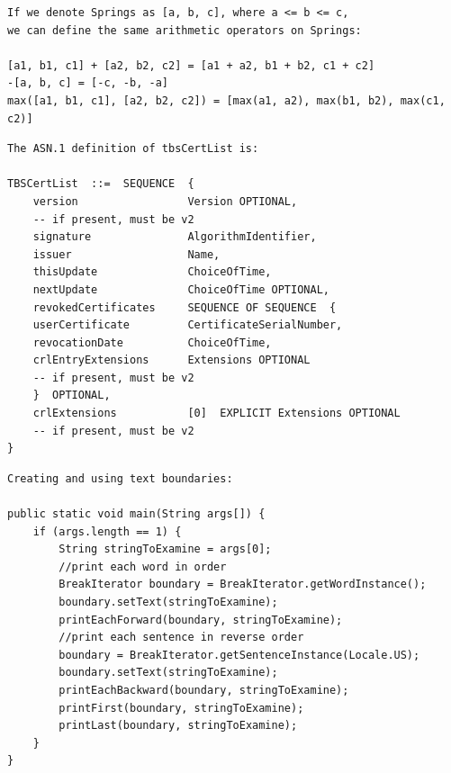 \begin{lstlisting}[label=invalid-caveat-1,caption={An example of a caveat sentence extracted from the \lstinline{javax.swing.Spring} documentation containing some snippets of code or mathematical expressions. Code sections are highlighted pink.},float,frame=tb,numbers=none,language=None,linebackgroundcolor={\lstcolorlines{4,5,6}}]
If we denote Springs as [a, b, c], where a <= b <= c, 
we can define the same arithmetic operators on Springs:

[a1, b1, c1] + [a2, b2, c2] = [a1 + a2, b1 + b2, c1 + c2]
-[a, b, c] = [-c, -b, -a]
max([a1, b1, c1], [a2, b2, c2]) = [max(a1, a2), max(b1, b2), max(c1, c2)]
\end{lstlisting}

\begin{lstlisting}[label=invalid-caveat-2,caption={An example of a caveat sentence extracted from the \lstinline{java.security.cert.X509CRL} documentation explaining the structure of a \lstinline{TBSCertList} object. Code sections are highlighted pink.},float,frame=tb,numbers=none,language=None,linebackgroundcolor={\lstcolorlines{3,4,5,6,7,8,9,10,11,12,13,14,15,16,17}}]
The ASN.1 definition of tbsCertList is:

TBSCertList  ::=  SEQUENCE  {
	version                 Version OPTIONAL,
	-- if present, must be v2
	signature               AlgorithmIdentifier,
	issuer                  Name,
	thisUpdate              ChoiceOfTime,
	nextUpdate              ChoiceOfTime OPTIONAL,
	revokedCertificates     SEQUENCE OF SEQUENCE  {
	userCertificate         CertificateSerialNumber,
	revocationDate          ChoiceOfTime,
	crlEntryExtensions      Extensions OPTIONAL
	-- if present, must be v2
	}  OPTIONAL,
	crlExtensions           [0]  EXPLICIT Extensions OPTIONAL
	-- if present, must be v2
}
\end{lstlisting}

\clearpage

\begin{lstlisting}[label=invalid-caveat-3,caption={An example of a caveat sentence extracted from the \lstinline{java.text.BreakIterator} documentation that contains some sample code. Code sections are highlighted pink.},float,frame=tb,numbers=none,language=None,linebackgroundcolor={\lstcolorlines{3,4,5,6,7,8,9,10,11,12,13,14,15,16,17}}]
Creating and using text boundaries:

public static void main(String args[]) {
	if (args.length == 1) {
		String stringToExamine = args[0];
		//print each word in order
		BreakIterator boundary = BreakIterator.getWordInstance();
		boundary.setText(stringToExamine);
		printEachForward(boundary, stringToExamine);
		//print each sentence in reverse order
		boundary = BreakIterator.getSentenceInstance(Locale.US);
		boundary.setText(stringToExamine);
		printEachBackward(boundary, stringToExamine);
		printFirst(boundary, stringToExamine);
		printLast(boundary, stringToExamine);
	}
}
\end{lstlisting}

